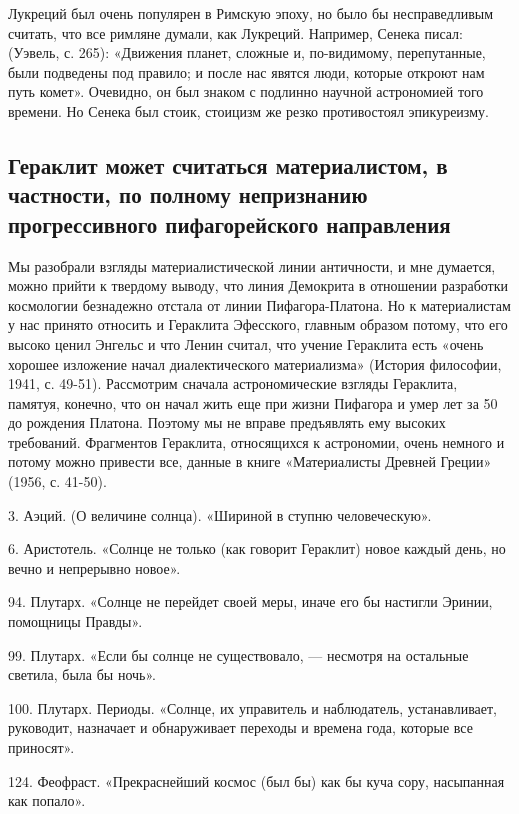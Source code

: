 Лукреций был очень популярен в Римскую эпоху, но было бы
несправедливым считать, что все римляне думали, как Лукреций.
Например, Сенека писал: (Уэвель, с. 265): «Движения планет, сложные и,
по-видимому, перепутанные, были подведены под правило; и после нас
явятся люди, которые откроют нам путь комет». Очевидно, он был знаком
с подлинно научной астрономией того времени. Но Сенека был стоик,
стоицизм же резко противостоял эпикуреизму.

\subsection{Гераклит может считаться материалистом, в частности, по
полному непризнанию прогрессивного пифагорейского направления}

Мы разобрали взгляды материалистической линии античности, и мне
думается, можно прийти к твердому выводу, что линия Демокрита в
отношении разработки космологии безнадежно отстала от линии
Пифагора-Платона. Но к материалистам у нас принято относить и
Гераклита Эфесского, главным образом потому, что его высоко ценил
Энгельс и что Ленин считал, что учение Гераклита есть «очень хорошее
изложение начал диалектического материализма» (История философии,
1941, с. 49-51). Рассмотрим сначала астрономические взгляды Гераклита,
памятуя, конечно, что он начал жить еще при жизни Пифагора и умер лет
за 50 до рождения Платона. Поэтому мы не вправе предъявлять ему
высоких требований. Фрагментов Гераклита, относящихся к астрономии,
очень немного и потому можно привести все, данные в книге
«Материалисты Древней Греции» (1956, с. 41-50).

3. Аэций. (О величине солнца). «Шириной в ступню человеческую».

6. Аристотель. «Солнце не только (как говорит Гераклит) новое каждый
день, но вечно и непрерывно новое».

94. Плутарх. «Солнце не перейдет своей меры, иначе его бы настигли
Эринии, помощницы Правды».

99. Плутарх. «Если бы солнце не существовало, --- несмотря на
остальные светила, была бы ночь».

100. Плутарх. Периоды. «Солнце, их управитель и наблюдатель,
устанавливает, руководит, назначает и обнаруживает переходы и времена
года, которые все приносят».

124. Феофраст. «Прекраснейший космос (был бы) как бы куча сору,
насыпанная как попало».

